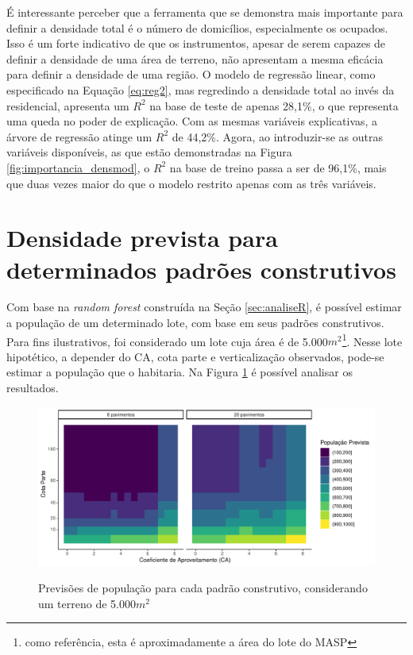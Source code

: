 É interessante perceber que a ferramenta que se demonstra mais importante para definir a densidade total é o número de domicílios, especialmente os ocupados. Isso é um forte indicativo de que os instrumentos, apesar de serem capazes de definir a densidade de uma área de terreno, não apresentam a mesma eficácia para definir a densidade de uma região. O modelo de regressão linear, como especificado na Equação \ref{eq:reg2}, mas regredindo a densidade total ao invés da residencial, apresenta um $R^2$ na base de teste de apenas 28,1\%, o que representa uma queda no poder de explicação. Com as mesmas variáveis explicativas, a árvore de regressão atinge um $R^2$ de 44,2\%. Agora, ao introduzir-se as outras variáveis disponíveis, as que estão demonstradas na Figura \ref{fig:importancia_densmod}, o $R^2$ na base de treino passa a ser de 96,1\%, mais que duas vezes maior do que o modelo restrito apenas com as três variáveis. 

\section{Densidade prevista para determinados padrões construtivos}

Com base na \textit{random forest} construída na Seção \ref{sec:analiseR}, é possível estimar a população de um determinado lote, com base em seus padrões construtivos. Para fins ilustrativos, foi considerado um lote cuja área é de 5.000$m^2$\footnote{como referência, esta é aproximadamente a área do lote do MASP}. Nesse lote hipotético, a depender do CA, cota parte e verticalização observados, pode-se estimar a população que o habitaria. Na Figura \ref{fig:previsoes} é possível analisar os resultados.

\begin{figure}[h]
    \centering
    \caption{Previsões de população para cada padrão construtivo, considerando um terreno de 5.000$m^2$}
    \includegraphics[width = \textwidth]{imagens/previsoes.pdf}
    \label{fig:previsoes}
\end{figure}

